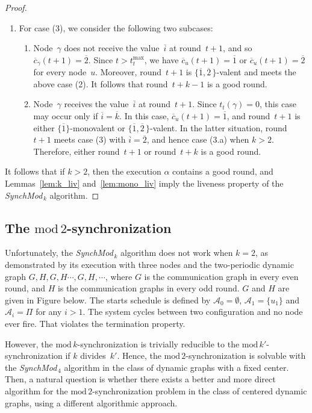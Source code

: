 \documentclass{article}
\newcommand{\cent}{\gamma}
\newcommand{\try}{t_{t}}
\newcommand{\SM}{{\em SynchMod}$_{\,k}$ }
\begin{document}
\begin{proof}
\begin{enumerate}
\item For case (3),  we consider the following two subcases:
\begin{enumerate}
\item Node~$\cent$ does not receive the value~$ \overline{i} $ at round~$t+1$, and so $ \overline{c}_{\cent}(t + 1)  = \overline{ 2 } $.
Since  $t> \try^{\max} $, we have $  \overline{c}_{u}(t + 1)  = \overline{ 1 } $ or $  \overline{c}_{u}(t + 1)  = \overline{ 2 } $ 
	for every node~$u$.
Moreover, round~$t+1$ is $ \{\overline{1} , \overline{2} \, \}$-valent and meets the above case (2).
It follows that round~$t +k-1$ is a good round.
\item Node~$\cent$ receives the value~$ \overline{i} $ at round~$t+1$.
Since $\try(\cent)= 0$, this case may occur only if $ \overline{i } = \overline{ k }$.
In this case, $  \overline{c}_{u}(t + 1)  = \overline{ 1 } $, and round~$t+1$ is either 
	$ \{\overline{1}\}$-monovalent or  $ \{\overline{1} , \overline{2} \, \}$-valent.
In the latter situation,  round~$t+1$ meets case (3) with $\overline{i}  =\overline{2} $, and hence case (3.a) when  $k>2$.
Therefore, either round~$t+1$ or round~$t+k$ is a good round.
\end{enumerate}
\end{enumerate}
It follows that if $k>2$, then the execution $\alpha$ contains a good round, and
	Lemmas~\ref{lem:k_liv} and~\ref{lem:mono_liv} imply the liveness property of the \SM algorithm.
\end{proof}

\subsection{The $\mathrm{mod}\,2$-synchronization}\label{sec:k=2}

Unfortunately, the \SM algorithm does not work when $k=2$, as demonstrated by its execution 
	with three nodes and the two-periodic dynamic graph 
	$G,H,G,H \cdots, G, H, \cdots$, where $G$ is the communication graph in every even round, and $H$ is the communication graphs in every odd round.
	$G$ and $H$ are given in Figure below.
	The starts schedule is defined by $\mathcal{A}_0 = \emptyset$, $\mathcal{A}_1 = \{u_1\}$ and $\mathcal{A}_i = \Pi$ for any $i>1$.
	The system cycles between two configuration and no node ever fire. That violates the termination property. 
	
However,  the $\mathrm{mod}\,k$-synchronization is trivially reducible to the $\mathrm{mod}\,k'$-synchronization 
	if $k$ divides~$k'$.
Hence, the $\mathrm{mod}\,2$-synchronization is solvable with the {\em SynchMod}$_{\,4}$ algorithm 
	in the class of dynamic  graphs with a fixed center.
Then, a  natural question is  whether there exists a better and more direct algorithm for the $\mathrm{mod}\,2$-synchronization
	problem in the class of  centered dynamic graphs, using a  different algorithmic approach. 
\end{document}
